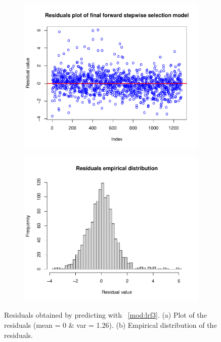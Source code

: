 \begin{figure}[h]
	\centering
	\begin{subfigure}{.5\textwidth}
		\centering
		\includegraphics[width=0.7\linewidth]{ImageFiles/Regression/Forward/ForwardFinalModelResiduals.pdf}
		\caption{}
		\label{fig:ForwardFinalModelResiduals}
	\end{subfigure}%
	\begin{subfigure}{.5\textwidth}
		\centering
		\includegraphics[width=0.7\linewidth]{ImageFiles/Regression/Forward/ForwardFinalModelResidualsDist.pdf}
		\caption{}
		\label{fig:ForwardFinalModelResidualsDist}
	\end{subfigure}
	\caption{Residuals obtained by predicting with \Mod~\ref{mod:lrf3}. (a) Plot of the residuals (mean = 0 \& var = 1.26). (b) Empirical distribution of the residuals.}
	\label{fig:FinalFSSM}
\end{figure}

